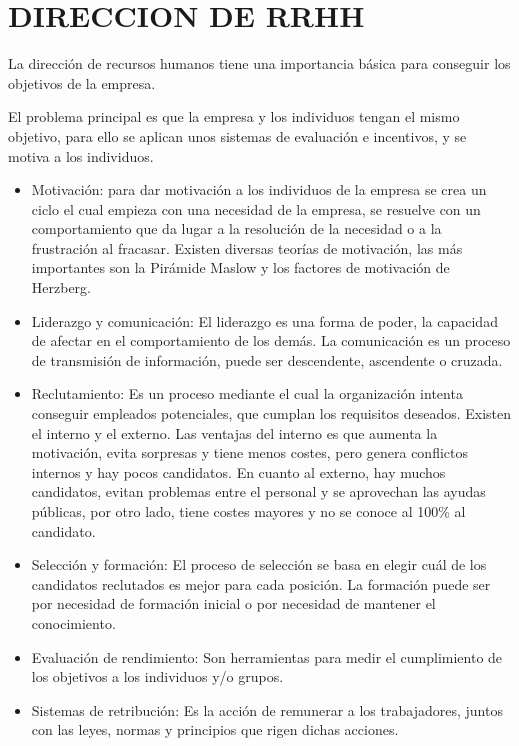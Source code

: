\documentclass[12pt, twoside, openright]{report} %
\begin{document}
\section{DIRECCION DE RRHH}
La dirección de recursos humanos tiene una importancia básica para conseguir los objetivos de la
empresa.

El problema principal es que la empresa y los individuos tengan el mismo objetivo, para ello se
aplican unos sistemas de evaluación e incentivos, y se motiva a los individuos.
\begin{itemize}
	\item Motivación: para dar motivación a los individuos de la empresa se crea un ciclo el cual empieza
	      con una necesidad de la empresa, se resuelve con un comportamiento que da lugar a la
	      resolución de la necesidad o a la frustración al fracasar. Existen diversas teorías de motivación,
	      las más importantes son la Pirámide Maslow y los factores de motivación de Herzberg.
	\item Liderazgo y comunicación: El liderazgo es una forma de poder, la capacidad de afectar en el
	      comportamiento de los demás. La comunicación es un proceso de transmisión de información,
	      puede ser descendente, ascendente o cruzada.
	\item Reclutamiento: Es un proceso mediante el cual la organización intenta conseguir empleados
	      potenciales, que cumplan los requisitos deseados. Existen el interno y el externo. Las ventajas
	      del interno es que aumenta la motivación, evita sorpresas y tiene menos costes, pero genera
	      conflictos internos y hay pocos candidatos. En cuanto al externo, hay muchos candidatos,
	      evitan problemas entre el personal y se aprovechan las ayudas públicas, por otro lado, tiene
	      costes mayores y no se conoce al 100\% al candidato.
	\item Selección y formación: El proceso de selección se basa en elegir cuál de los candidatos
	      reclutados es mejor para cada posición. La formación puede ser por necesidad de formación
	      inicial o por necesidad de mantener el conocimiento.
	\item Evaluación de rendimiento: Son herramientas para medir el cumplimiento de los objetivos a
	      los individuos y/o grupos.
	\item Sistemas de retribución: Es la acción de remunerar a los trabajadores, juntos con las leyes,
	      normas y principios que rigen dichas acciones.
\end{itemize}
\end{document}
